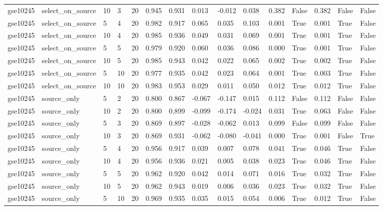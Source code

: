 \begin{table}[t]
\begin{tabular}{lllllllllllllll}
    gse10245 & select\_on\_source & 10 & 3 & 20 & 0.945 & 0.931 & 0.013 & -0.012 & 0.038 & 0.382 & False & 0.382 & False & False \\
    gse10245 & select\_on\_source & 5 & 4 & 20 & 0.982 & 0.917 & 0.065 & 0.035 & 0.103 & 0.001 & True & 0.001 & True & False \\
    gse10245 & select\_on\_source & 10 & 4 & 20 & 0.985 & 0.936 & 0.049 & 0.031 & 0.069 & 0.001 & True & 0.001 & True & False \\
    gse10245 & select\_on\_source & 5 & 5 & 20 & 0.979 & 0.920 & 0.060 & 0.036 & 0.086 & 0.000 & True & 0.001 & True & False \\
    gse10245 & select\_on\_source & 10 & 5 & 20 & 0.985 & 0.943 & 0.042 & 0.022 & 0.065 & 0.002 & True & 0.002 & True & False \\
    gse10245 & select\_on\_source & 5 & 10 & 20 & 0.977 & 0.935 & 0.042 & 0.023 & 0.064 & 0.001 & True & 0.003 & True & False \\
    gse10245 & select\_on\_source & 10 & 10 & 20 & 0.983 & 0.953 & 0.029 & 0.011 & 0.050 & 0.012 & True & 0.012 & True & False \\
    gse10245 & source\_only & 5 & 2 & 20 & 0.800 & 0.867 & -0.067 & -0.147 & 0.015 & 0.112 & False & 0.112 & False & False \\
    gse10245 & source\_only & 10 & 2 & 20 & 0.800 & 0.899 & -0.099 & -0.174 & -0.024 & 0.031 & True & 0.063 & False & False \\
    gse10245 & source\_only & 5 & 3 & 20 & 0.869 & 0.897 & -0.028 & -0.062 & 0.013 & 0.099 & False & 0.099 & False & False \\
    gse10245 & source\_only & 10 & 3 & 20 & 0.869 & 0.931 & -0.062 & -0.080 & -0.041 & 0.000 & True & 0.001 & False & True \\
    gse10245 & source\_only & 5 & 4 & 20 & 0.956 & 0.917 & 0.039 & 0.007 & 0.078 & 0.041 & True & 0.046 & True & False \\
    gse10245 & source\_only & 10 & 4 & 20 & 0.956 & 0.936 & 0.021 & 0.005 & 0.038 & 0.023 & True & 0.046 & True & False \\
    gse10245 & source\_only & 5 & 5 & 20 & 0.962 & 0.920 & 0.042 & 0.014 & 0.071 & 0.016 & True & 0.032 & True & False \\
    gse10245 & source\_only & 10 & 5 & 20 & 0.962 & 0.943 & 0.019 & 0.006 & 0.036 & 0.023 & True & 0.032 & True & False \\
    gse10245 & source\_only & 5 & 10 & 20 & 0.969 & 0.935 & 0.035 & 0.015 & 0.054 & 0.006 & True & 0.012 & True & False \\

\end{tabular}
\end{table}
